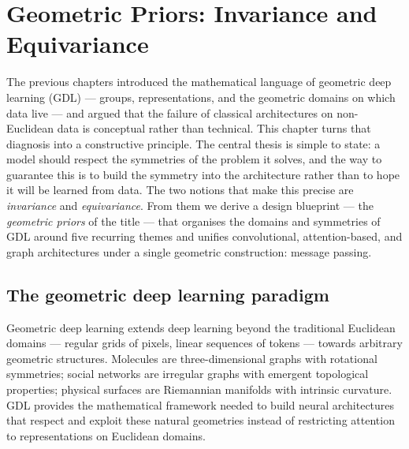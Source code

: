 \providecommand{\Nb}{\mathcal{N}}
\providecommand{\GL}{\operatorname{GL}}
\providecommand{\Aut}{\operatorname{Aut}}
\providecommand{\tr}{\operatorname{tr}}
\providecommand{\HASH}{\operatorname{HASH}}
\providecommand{\deg}{\operatorname{deg}}

\chapter{Geometric Priors: Invariance and Equivariance}
\label{ch:priors}

The previous chapters introduced the mathematical language of geometric deep
learning (GDL) --- groups, representations, and the geometric domains on which
data live --- and argued that the failure of classical architectures on
non-Euclidean data is conceptual rather than technical. This chapter turns that
diagnosis into a constructive principle. The central thesis is simple to state:
a model should respect the symmetries of the problem it solves, and the way to
guarantee this is to build the symmetry into the architecture rather than to
hope it will be learned from data. The two notions that make this precise are
\emph{invariance} and \emph{equivariance}. From them we derive a design
blueprint --- the \emph{geometric priors} of the title --- that organises the
domains and symmetries of GDL around five recurring themes and unifies
convolutional, attention-based, and graph architectures under a single
geometric construction: message passing.

\section{The geometric deep learning paradigm}
\label{sec:priors:paradigm}

Geometric deep learning extends deep learning beyond the traditional Euclidean
domains --- regular grids of pixels, linear sequences of tokens --- towards
arbitrary geometric structures. Molecules are three-dimensional graphs with
rotational symmetries; social networks are irregular graphs with emergent
topological properties; physical surfaces are Riemannian manifolds with
intrinsic curvature. GDL provides the mathematical framework needed to build
neural architectures that respect and exploit these natural geometries instead
of restricting attention to representations on Euclidean domains.

